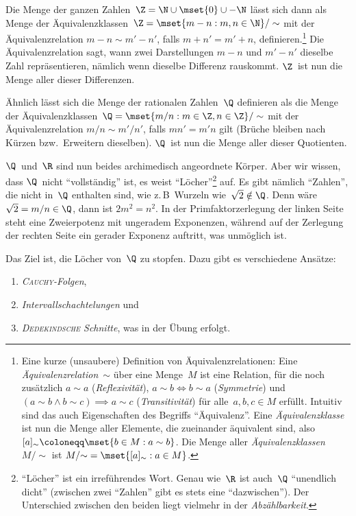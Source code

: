\documentclass[a4paper]{article}
\begin{document}
Die Menge der ganzen Zahlen~$\Z = \N \cup \mset{0} \cup -\N$ lässt sich dann als Menge der Äquivalenzklassen~$\Z = \mset{m-n : m, n \in \N} / \sim$ mit der Äquivalenzrelation $m-n \sim m'-n'$, falls $m+n' = m'+n$, definieren.\footnote{Eine kurze (unsaubere) Definition von Äquivalenzrelationen: Eine \emph{Äquivalenzrelation}~$\sim$ über eine Menge~$M$ ist eine Relation, für die noch zusätzlich $a \sim a$ (\emph{Reflexivität}), $a \sim b \iff b \sim a$ (\emph{Symmetrie}) und $(a \sim b \wedge b \sim c) \implies a \sim c$ (\emph{Transitivität}) für alle~$a, b, c \in M$ erfüllt. Intuitiv sind das auch Eigenschaften des Begriffs "`Äquivalenz"'. Eine \emph{Äquivalenzklasse} ist nun die Menge aller Elemente, die zueinander äquivalent sind, also $[a]_\sim \coloneqq \mset{b \in M : a \sim b}$. Die Menge aller \emph{Äquivalenzklassen}~$M/{\sim}$ ist $M/{\sim} = \mset{[a]_\sim : a \in M}$.} Die Äquivalenzrelation sagt, wann zwei Darstellungen $m-n$ und $m'-n'$ dieselbe Zahl repräsentieren, nämlich wenn dieselbe Differenz rauskommt. $\Z$~ist nun die Menge aller dieser Differenzen.

Ähnlich lässt sich die Menge der rationalen Zahlen~$\Q$ definieren als die Menge der Äquivalenzklassen~$\Q = \mset{m/n : m \in \Z, n \in \Z} / \sim$ mit der Äquivalenzrelation $m/n \sim m'/n'$, falls $mn' = m'n$ gilt (Brüche bleiben nach Kürzen bzw.\ Erweitern dieselben). $\Q$~ist nun die Menge aller dieser Quotienten.

$\Q$~und~$\R$ sind nun beides archimedisch angeordnete Körper. Aber wir wissen, dass $\Q$~nicht "`vollständig"' ist, es weist "`Löcher"'\footnote{"`Löcher"' ist ein irreführendes Wort. Genau wie~$\R$ ist auch~$\Q$ "`unendlich dicht"' (zwischen zwei "`Zahlen"' gibt es stets eine "`dazwischen"'). Der Unterschied zwischen den beiden liegt vielmehr in der \emph{Abzählbarkeit}.} auf. Es gibt nämlich "`Zahlen"', die nicht in~$\Q$ enthalten sind, wie z.\,B\ Wurzeln wie~$\sqrt{2} \notin \Q$. Denn wäre $\sqrt{2} = m/n \in \Q$, dann ist $2m^2 = n^2$. In der Primfaktorzerlegung der linken Seite steht eine Zweierpotenz mit ungeradem Exponenzen, während auf der Zerlegung der rechten Seite ein gerader Exponenz auftritt, was unmöglich ist.

Das Ziel ist, die Löcher von~$\Q$ zu stopfen. Dazu gibt es verschiedene Ansätze:
\begin{enumerate}
    \item \emph{\textsc{Cauchy}-Folgen},
    \item \emph{Intervallschachtelungen} und
    \item \emph{\textsc{Dedekindsche} Schnitte}, was in der Übung erfolgt.
\end{enumerate}
\end{document}
